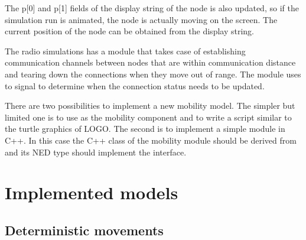The p[0] and p[1] fields of the display string of the node is
also updated, so if the simulation run is animated, the node is
actually moving on the screen. The current position of the node
can be obtained from the display string.

The radio simulations has a  module that takes case of
establishing communication channels between nodes that are within
communication distance and tearing down the connections when they
move out of range. The  module uses to
 signal to determine when the connection
status needs to be updated.

There are two possibilities to implement a new mobility model. The simpler but
limited one is to use  as the mobility component and to
write a script similar to the turtle graphics of LOGO. The second is to
implement a simple module in C++. In this case the C++ class of the mobility
module should be derived from  and its NED type should
implement the  interface.




\section{Implemented models}

\subsection{Deterministic movements}


